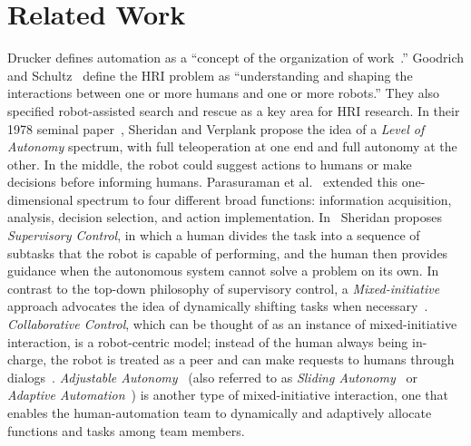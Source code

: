 \documentclass[journal]{IEEEtran}
\begin{document}
\section{Related Work}
\label{sec:RelatedWork6}

Drucker defines automation as a ``concept of the organization of work~\cite{Drucker2006Practice}.'' Goodrich and Schultz~\cite{Goodrich2007HRISurvey} define the HRI problem as ``understanding and shaping the interactions between one or more humans and one or more robots.'' They also specified robot-assisted search and rescue as a key area for HRI research. In their 1978 seminal paper~\cite{Sheridan1978Human}, Sheridan and Verplank propose the idea of a \textit{Level of Autonomy} spectrum, with full teleoperation at one end and full autonomy at the other. In the middle, the robot could suggest actions to humans or make decisions before informing humans. Parasuraman et al.\ \cite{Parasuraman2000Model} extended this one-dimensional spectrum to four different broad functions: information acquisition, analysis, decision selection, and action implementation. In~\cite{Sheridan1992Telerobotics} Sheridan proposes \textit{Supervisory Control}, in which a human divides the task into a sequence of subtasks that the robot is capable of performing, and the human then provides guidance when the autonomous system cannot solve a problem on its own. In contrast to the top-down philosophy of supervisory control, a \textit{Mixed-initiative} approach advocates the idea of dynamically shifting tasks when necessary~\cite{Hearst1999Mixed}. \textit{Collaborative Control}, which can be thought of as an instance of mixed-initiative interaction, is a robot-centric model; instead of the human always being in-charge, the robot is treated as a peer and can make requests to humans through dialogs~\cite{Fong1999Collaborative}. \textit{Adjustable Autonomy}~\cite{Dorais2001Designing} (also referred to as \textit{Sliding Autonomy}~\cite{Dias2008SlidingAutonomy} or \textit{Adaptive Automation}~\cite{Rouse1988Adaptive}) is another type of mixed-initiative interaction, one that enables the human-automation team to dynamically and adaptively allocate functions and tasks among team members. 
\end{document}

